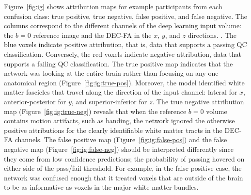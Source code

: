 \documentclass[fleqn,10pt,inline]{wlscirep}
\begin{document}
Figure~\ref{fig:ig} shows attribution maps for example participants from each
confusion class: true positive, true negative, false positive, and false
negative. The columns correspond to the different channels of the deep learning
input volume: the $b=0$ reference image and the DEC-FA in the $x$, $y$, and $z$
directions. . 
The blue voxels indicate positive attribution, that is, data that supports a passing QC classification. Conversely, the red voxels indicate negative attribution, data that supports a failing QC classification.
The true positive map indicates that the network was looking at the
entire brain rather than focusing on any one anatomical region
(Figure~\ref{fig:ig:true-pos}). Moreover, the model identified white matter
fascicles that travel along the direction of the input channel: lateral for $x$,
anterior-posterior for $y$, and superior-inferior for $z$. The true negative
attribution map (Figure~\ref{fig:ig:true-neg}) reveals that when the reference
$b=0$ volume contains motion artifacts, such as banding, the network ignored the
otherwise positive attributions for the clearly identifiable white matter tracts
in the DEC-FA channels. The false positive map (Figure~\ref{fig:ig:false-pos})
and the false negative map (Figure~\ref{fig:ig:false-neg}) should be interpreted
differently since they come from low confidence predictions; the probability of
passing hovered on either side of the pass/fail threshold. For example, in the
false positive case, the network was confused enough that it treated voxels that
are outside of the brain to be as informative as voxels in the major white matter bundles.
\end{document}
